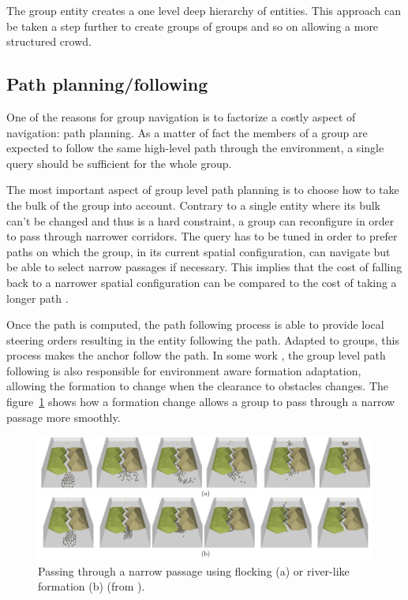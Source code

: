 \documentclass{article}
\begin{document}
The group entity creates a one level deep hierarchy of entities. This approach can be taken a step further to create groups of groups and so on \cite{Schuerman:2010um,Millington:2006wz} allowing a more structured crowd.

\subsection{Path planning/following}
One of the reasons for group navigation is to factorize a costly aspect of navigation: path planning. As a matter of fact the members of a group are expected to follow the same high-level path through the environment, a single query should be sufficient for the whole group.

The most important aspect of group level path planning is to choose how to take the bulk of the group into account.  Contrary to a single entity where its bulk can’t be changed and thus is a hard constraint, a group can reconfigure in order to pass through narrower corridors. The query has to be tuned in order to prefer paths on which the group, in its current spatial configuration, can navigate but be able to select narrow passages if necessary. This implies that the cost of falling back to a narrower spatial configuration can be compared to the cost of taking a longer path \cite{Kamphuis:2004ct,Pottinger:1999vk,Bayazit:2003up}.

Once the path is computed, the path following process is able to provide local steering orders resulting in the entity following the path. Adapted to groups, this process makes the anchor follow the path. In some work \cite{Bayazit:2003up,Pottinger:1999vk}, the group level path following is also responsible for environment aware formation adaptation, allowing the formation to change when the clearance to obstacles changes. The figure~\ref{fig:narrow_passage} shows how a formation change allows a group to pass through a narrow passage more smoothly.

\begin{figure}[htb]
\centering
\includegraphics[width=\textwidth]{NarrowPassage.jpg}
\caption{Passing through a narrow passage using flocking (a) or river-like formation (b) (from \cite{Bayazit:2003up}).}
\label{fig:narrow_passage}
\end{figure} 
\end{document}
